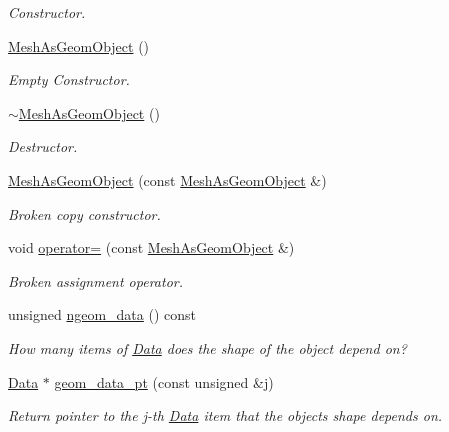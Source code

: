\begin{DoxyCompactItemize}
\begin{DoxyCompactList}\small\item\em Constructor. \end{DoxyCompactList}\item 
\hyperlink{classoomph_1_1MeshAsGeomObject_a0488e25a39e03033a3ffff3018295205}{Mesh\+As\+Geom\+Object} ()
\begin{DoxyCompactList}\small\item\em Empty Constructor. \end{DoxyCompactList}\item 
\hyperlink{classoomph_1_1MeshAsGeomObject_a895085ac382bddf1127b4076be12c5fb}{$\sim$\+Mesh\+As\+Geom\+Object} ()
\begin{DoxyCompactList}\small\item\em Destructor. \end{DoxyCompactList}\item 
\hyperlink{classoomph_1_1MeshAsGeomObject_a8c2fdc875fab09c5e261308d96f251ce}{Mesh\+As\+Geom\+Object} (const \hyperlink{classoomph_1_1MeshAsGeomObject}{Mesh\+As\+Geom\+Object} \&)
\begin{DoxyCompactList}\small\item\em Broken copy constructor. \end{DoxyCompactList}\item 
void \hyperlink{classoomph_1_1MeshAsGeomObject_a096b43730ef42a1df00ebc51fa114951}{operator=} (const \hyperlink{classoomph_1_1MeshAsGeomObject}{Mesh\+As\+Geom\+Object} \&)
\begin{DoxyCompactList}\small\item\em Broken assignment operator. \end{DoxyCompactList}\item 
unsigned \hyperlink{classoomph_1_1MeshAsGeomObject_a47d0c877a05e1d84703052431396cd0c}{ngeom\+\_\+data} () const
\begin{DoxyCompactList}\small\item\em How many items of \hyperlink{classoomph_1_1Data}{Data} does the shape of the object depend on? \end{DoxyCompactList}\item 
\hyperlink{classoomph_1_1Data}{Data} $\ast$ \hyperlink{classoomph_1_1MeshAsGeomObject_a8d19ac59e6b236c61ffbcd434ad3b339}{geom\+\_\+data\+\_\+pt} (const unsigned \&j)
\begin{DoxyCompactList}\small\item\em Return pointer to the j-\/th \hyperlink{classoomph_1_1Data}{Data} item that the object\textquotesingle{}s shape depends on. \end{DoxyCompactList}\item 

\end{DoxyCompactItemize}
